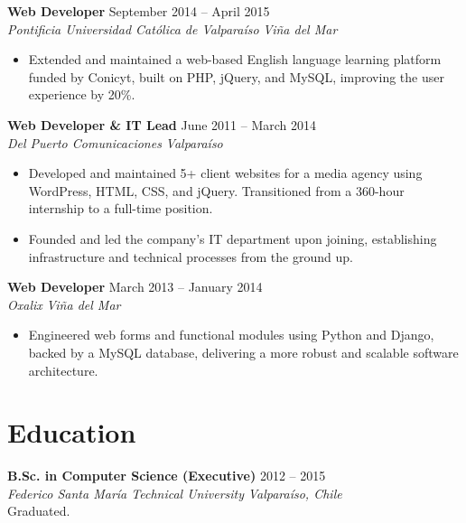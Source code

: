 \documentclass[11pt,a4paper]{article}
\newcommand{\job}[4]{%
    \textbf{#1} \hfill #2\\
    \textit{#3} \hfill \textit{#4}\\[2pt]
}
\begin{document}
\job{Web Developer}{September 2014 -- April 2015}{Pontificia Universidad Católica de Valparaíso}{Viña del Mar}
\begin{itemize}[leftmargin=*, itemsep=1pt, topsep=2pt]
    \item Extended and maintained a web-based English language learning platform funded by Conicyt, built on PHP, jQuery, and MySQL, improving the user experience by 20\%.
\end{itemize}

\job{Web Developer \& IT Lead}{June 2011 -- March 2014}{Del Puerto Comunicaciones}{Valparaíso}
\begin{itemize}[leftmargin=*, itemsep=1pt, topsep=2pt]
    \item Developed and maintained 5+ client websites for a media agency using WordPress, HTML, CSS, and jQuery. Transitioned from a 360-hour internship to a full-time position.
    \item Founded and led the company's IT department upon joining, establishing infrastructure and technical processes from the ground up.
\end{itemize}

\job{Web Developer}{March 2013 -- January 2014}{Oxalix}{Viña del Mar}
\begin{itemize}[leftmargin=*, itemsep=1pt, topsep=2pt]
    \item Engineered web forms and functional modules using Python and Django, backed by a MySQL database, delivering a more robust and scalable software architecture.
\end{itemize}


\section*{Education}
\textbf{B.Sc. in Computer Science (Executive)} \hfill 2012 -- 2015\\
\textit{Federico Santa María Technical University} \hfill \textit{Valparaíso, Chile}\\
Graduated.

\end{document}
